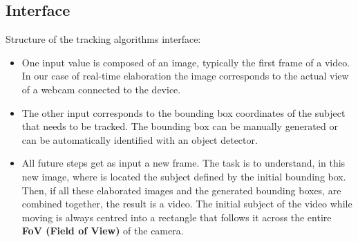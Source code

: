 \subsection{Interface}
Structure of the tracking algorithms interface:
\begin{itemize}
	\item One input value is composed of an image, typically the first frame of a video. In our case of real-time elaboration the image corresponds to the actual view of a webcam connected to the device.
	\item The other input corresponds to the bounding box coordinates of the subject that needs to be tracked. The bounding box can be manually generated or can be automatically identified with an object detector.
	\item All future steps get as input a new frame. The task is to understand, in this new image, where is located the subject defined by the initial bounding box.\\
	Then, if all these elaborated images and the generated bounding boxes, are combined together, the result is a video. The initial subject of the video while moving is always centred into a rectangle that follows it across the entire \textbf{FoV (Field of View)} of the camera.
\end{itemize}


